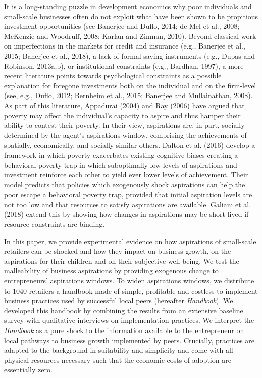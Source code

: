 \documentclass[11.5pt]{article}
\begin{document}
It is a long-standing puzzle in development economics why poor individuals and small-scale businesses often do not exploit what have been shown to be propitious investment opportunities (see Banerjee and Duflo, 2014; de Mel et al., 2008; McKenzie and Woodruff, 2008; Karlan and Zinman, 2010). Beyond classical work on imperfections in the markets for credit and insurance (e.g., Banerjee et al., 2015; Banerjee et al., 2018), a lack of formal saving instruments (e.g., Dupas and Robinson, 2013a,b), or institutional constraints (e.g., Bardhan, 1997), a more recent literature points towards psychological constraints as a possible explanation for foregone investments both on the individual and on the firm-level (see, e.g., Duflo, 2012; Bernheim et al., 2015; Banerjee and Mullainathan, 2008). As part of this literature, Appadurai (2004) and Ray (2006) have argued that poverty may affect the individual's capacity to aspire and thus hamper their ability to contest their poverty. In their view, aspirations are, in part, socially determined by the agent's aspirations window, comprising the achievements of spatially, economically, and socially similar others. Dalton et al. (2016) develop a framework in which poverty exacerbates existing cognitive biases creating a behavioral poverty trap in which suboptimally low levels of aspirations and investment reinforce each other to yield ever lower levels of achievement. Their model predicts that policies which exogenously shock aspirations can help the poor escape a behavioral poverty trap, provided that initial aspiration levels are not too low and that resources to satisfy aspirations are available. Galiani et al. (2018) extend this by showing how changes in aspirations may be short-lived if resource constraints are binding.

In this paper, we provide experimental evidence on how aspirations of small-scale retailers can be shocked and how they impact on business growth, on the aspirations for their children and on their subjective well-being. We test the malleability of business aspirations by providing exogenous change to entrepreneurs' aspirations windows. %
To widen aspirations windows, we distribute to 1040 retailers a handbook made of simple, profitable and costless to implement business practices used by successful local peers (hereafter \emph{Handbook}). We developed this handbook by combining the results from an extensive baseline survey with qualitative interviews on implementation practices. We interpret the \emph{Handbook} as a pure shock to the information available to the entrepreneur on local pathways to business growth implemented by peers. Crucially, practices are adapted to the background in suitability and simplicity and come with all physical resources necessary such that the economic costs of adoption are essentially zero.
\end{document}
